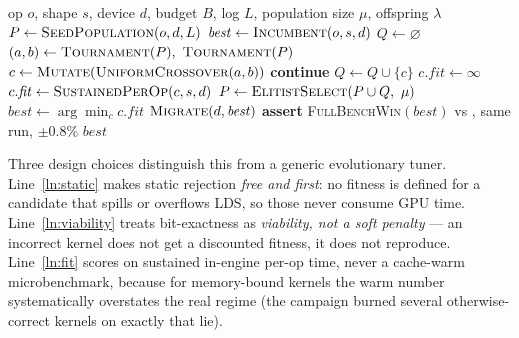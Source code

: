 \documentclass[11pt]{article}
\begin{document}
\begin{algorithm}[h]
\caption{\textsc{EvoSchedule} --- multi-fidelity search over comptime schedules}
\label{alg:evo}
\begin{algorithmic}[1]
\Require op $o$, shape $s$, device $d$, budget $B$, log $L$, population size $\mu$, offspring $\lambda$
\State $P \gets \textsc{SeedPopulation}(o, d, L)$ 
\State $\mathit{best} \gets \textsc{Incumbent}(o, s, d)$
  \State $Q \gets \varnothing$
     \State $(a,b) \gets \textsc{Tournament}(P),\ \textsc{Tournament}(P)$
     \State $c \gets \textsc{Mutate}(\textsc{UniformCrossover}(a,b))$ 
        \State \textbf{continue}  \label{ln:static}
     \EndIf
     \State $Q \gets Q \cup \{c\}$
  \EndFor
   
        \State $c.\mathit{fit} \gets \infty$  \label{ln:viability}
     \Else
        \State $c.\mathit{fit} \gets \textsc{SustainedPerOp}(c, s, d)$  \label{ln:fit}
     \EndIf
  \EndFor
  \State $P \gets \textsc{ElitistSelect}(P \cup Q,\ \mu)$
  \State $\mathit{best} \gets \arg\min_{c} c.\mathit{fit}$
  \State $\textsc{Migrate}(d, \mathit{best})$ 
\EndWhile
\State \textbf{assert} \textsc{FullBenchWin}$(\mathit{best})$ vs , same run, $\pm0.8\%$ 
\State \Return $\mathit{best}$
\end{algorithmic}
\end{algorithm}

Three design choices distinguish this from a generic evolutionary tuner. Line~\ref{ln:static} makes static
rejection \emph{free and first}: no fitness is defined for a candidate that spills or overflows LDS, so those
never consume GPU time. Line~\ref{ln:viability} treats bit-exactness as \emph{viability, not a soft penalty}
--- an incorrect kernel does not get a discounted fitness, it does not reproduce. Line~\ref{ln:fit} scores on
sustained in-engine per-op time, never a cache-warm microbenchmark, because for memory-bound kernels the warm
number systematically overstates the real regime (the campaign burned several otherwise-correct kernels on
exactly that lie).
\end{document}

